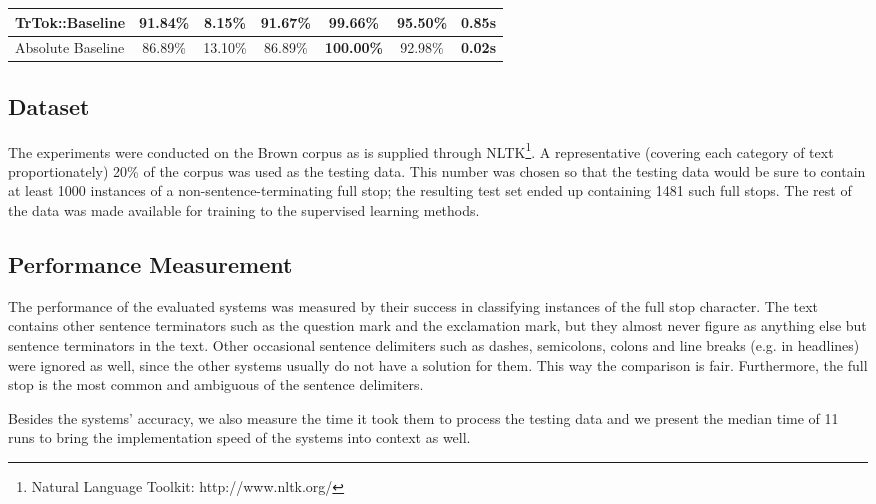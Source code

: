 \begin{table*}
\begin{center}
\begin{tabular}{ | l | c | c | c | c | c | r | }
      TrTok::Baseline & 91.84\% & 8.15\% & 91.67\%
                      & 99.66\% & 95.50\% & 0.85s \\ \hline
      Absolute Baseline & 86.89\% & 13.10\% & 86.89\%
                        & \textbf{100.00\%} & 92.98\% & \textbf{0.02s} \\ \hline
    \end{tabular}
  \end{center}
  \caption[Performance of sentence detectors on the Brown corpus] {The
    performance of the various sentence detectors on full stops from
    the Brown corpus testing data. \\ The 1.15 MB of testing data
    consisted of 11376 sentences and 232893 tokens.}
  \label{tbl:grand-melee}
\end{table*}

\subsection{Dataset}

The experiments were conducted on the Brown corpus \cite{data-brown}
as is supplied through NLTK\footnote{Natural Language Toolkit:
http://www.nltk.org/}. A representative (covering each category of
text proportionately) 20\% of the corpus was used as the testing data.
This number was chosen so that the testing data would be sure to
contain at least 1000 instances of a non-sentence-terminating full
stop; the resulting test set ended up containing 1481 such full stops.
The rest of the data was made available for training to the supervised
learning methods.

\subsection{Performance Measurement}

The performance of the evaluated systems was measured by their success
in classifying instances of the full stop character. The text contains
other sentence terminators such as the question mark and the
exclamation mark, but they almost never figure as anything else but
sentence terminators in the text. Other occasional sentence delimiters
such as dashes, semicolons, colons and line breaks (e.g. in headlines)
were ignored as well, since the other systems usually do not have a
solution for them. This way the comparison is fair. Furthermore, the
full stop is the most common and ambiguous of the sentence delimiters.

Besides the systems' accuracy, we also measure the time it took them
to process the testing data and we present the median time of 11 runs
to bring the implementation speed of the systems into context as well.

